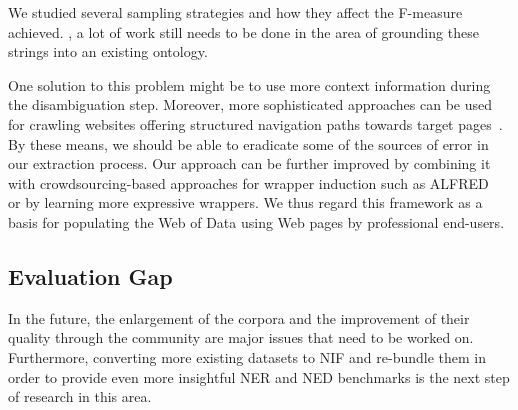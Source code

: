 We studied several sampling strategies and how they affect the F-measure achieved.
, a lot of work still needs to be done in the area of grounding these strings into an existing ontology.

One solution to this problem might be to use more context information during the disambiguation step.
Moreover, more sophisticated approaches can be used for crawling websites offering structured navigation paths towards target pages~\cite{DBLP:conf/webist/BlancoCM05}. 
By these means, we should be able to eradicate some of the sources of error in our extraction process. 
Our approach can be further improved by combining it with crowdsourcing-based approaches for wrapper induction such as ALFRED~\cite{Crescenzi2013} or by learning more expressive wrappers.
We thus regard this framework as a basis for populating the Web of Data using Web pages by professional end-users.


\subsection*{Evaluation Gap}



In the future, the enlargement of the corpora and the improvement of their quality through the community are major issues that need to be worked on. 
Furthermore, converting more existing datasets to NIF and re-bundle them in order to provide even more insightful NER and NED benchmarks is the next step of research in this area.


